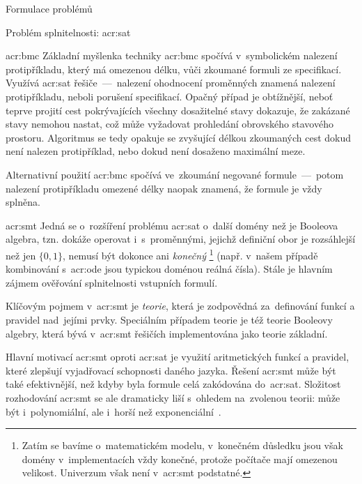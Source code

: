\documentclass[thesis=M,czech]{FITthesis}[2012/06/26]
\newcommand{\acrlabel}[1]{acr:#1}
\newcommand{\acr}[1]{\acrshort{\acrlabel{#1}}}
\newcommand{\acrf}[1]{\acrfull{\acrlabel{#1}}}
\newcommand{\hl}[1]{\textit{#1}}
\newcommand{\name}[1]{\hl{#1}}
\newcommand{\cit}[1]{\cite{#1}}
\begin{document}
\begin{section}{Formulace problémů}
\begin{subsection}{Problém splnitelnosti: \acr{sat}}
\begin{paragraph}{\acrf{bmc}}
Základní myšlenka techniky \acr{bmc} spočívá
v~symbolickém nalezení protipříkladu,
který má omezenou délku, vůči zkoumané formuli ze specifikací.
Využívá \acr{sat} řešiče~---~nalezení
ohodnocení proměnných znamená nalezení protipříkladu,
neboli porušení specifikací.
Opačný případ je obtížnější,
neboť teprve projití cest pokrývajících všechny dosažitelné stavy
dokazuje, že zakázané stavy nemohou nastat,
což může vyžadovat prohledání obrovského stavového prostoru.
Algoritmus se tedy opakuje se zvyšující délkou zkoumaných cest
dokud není nalezen protipříklad,
nebo dokud není dosaženo maximální meze.

Alternativní použití \acr{bmc} spočívá ve~zkoumání
negované formule~---~potom nalezení protipříkladu
omezené délky naopak znamená,
že formule je vždy splněna.
\end{paragraph} %


\end{subsection} %


\begin{subsection}{\acrf{smt}}\label{ss:theory:formulation:smt}
Jedná se o~rozšíření problému \acr{sat}
o~další domény než je Booleova algebra,
tzn. dokáže operovat i~s~proměnnými,
jejichž definiční obor je rozsáhlejší než jen
${\{0,1\}}$, nemusí být dokonce ani \hl{konečný}%
\footnote{Zatím se bavíme o~matematickém modelu,
v~konečném důsledku jsou však domény v~implementacích
vždy konečné, protože počítače mají omezenou velikost.
Univerzum však není v~\acr{smt} podstatné.}
(např. v~našem případě kombinování s~\acr{ode}
jsou typickou doménou reálná čísla).
Stále je hlavním zájmem ověřování
splnitelnosti vstupních formulí.

Klíčovým pojmem v~\acr{smt} je \name{teorie},
která je zodpovědná za~definování
funkcí a pravidel nad~jejími prvky.
Speciálním případem teorie je
též teorie Booleovy algebry,
která bývá v~\acr{smt} řešičích
implementována jako teorie základní.

Hlavní motivací \acr{smt} oproti \acr{sat}
je využití aritmetických funkcí a pravidel,
které zlepšují vyjadřovací schopnosti daného jazyka.
Řešení \acr{smt} může být také efektivnější,
než kdyby byla formule celá zakódována do~\acr{sat}.
Složitost rozhodování \acr{smt} se ale dramaticky liší
s~ohledem na~zvolenou teorii: může být i~polynomiální,
ale i~horší než exponenciální~\cit{theories-book}.


\end{subsection}
\end{section}
\end{document}
